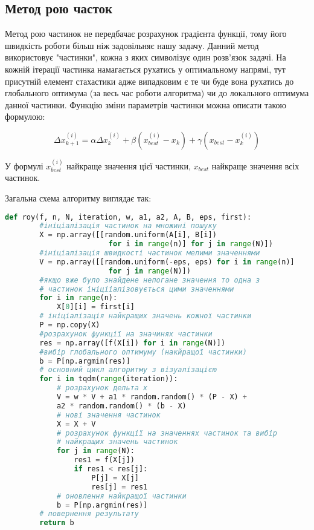 \subsection{Метод рою часток}


Метод рою частинок не передбачає розрахунок градієнта функції, тому його 
швидкість роботи більш ніж задовільняє нашу задачу.
Данний метод використовує "частинки", кожна з яких символізує один
розв'язок задачі. На кожній ітерації частинка намагається рухатись у 
оптимальному напрямі, тут присутній елемент стахастики адже випадковим є те 
чи буде вона рухатись до глобального оптимума (за весь час 
роботи алгоритма) чи до локального оптимума данної частинки. 
Функцію зміни параметрів частинки можна описати такою формулою: 

$$\Delta x_{k + 1}^{(i)} = \alpha \Delta x_k^{(i)} + 
\beta (x_{best}^{(i)} - x_k) + \gamma(x_{best} - x_k^{(i)})$$


У формулі $x_{best}^{(i)}$ найкраще значення цієї частинки, 
$x_{best}$ найкраще значення всіх частинок. 


Загальна схема алгоритму виглядає так: 
\begin{lstlisting}[language=Python, caption=Python example]
    def roy(f, n, N, iteration, w, a1, a2, A, B, eps, first):
        #ініціалізація частинок на множині пошуку
        X = np.array([[random.uniform(A[i], B[i]) 
                        for i in range(n)] for j in range(N)])
        #ініціалізація швидкості частинок мелими значеннями
        V = np.array([[random.uniform(-eps, eps) for i in range(n)] 
                        for j in range(N)])
        #якщо вже було знайдене непогане значення то одна з 
        # частинок ініцііалізовується цими значеннями
        for i in range(n):
            X[0][i] = first[i]
        # ініціалізація найкращих значень кожної частинки
        P = np.copy(X)
        #розрахунок функції на значинях частинки
        res = np.array([f(X[i]) for i in range(N)])
        #вибір глобального оптимуму (накйращої частинки)
        b = P[np.argmin(res)]
        # основний цикл алгоритму з візуалізацією
        for i in tqdm(range(iteration)):
            # розрахунок дельта х
            V = w * V + a1 * random.random() * (P - X) + 
            a2 * random.random() * (b - X)
            # нові значення частинок 
            X = X + V
            # розрахунок функції на значеннях частинок та вибір
            # найкращих значень частинок
            for j in range(N):
                res1 = f(X[j])
                if res1 < res[j]:
                    P[j] = X[j]
                    res[j] = res1
            # оновлення найкращої частинки
            b = P[np.argmin(res)]
        # повернення результату
        return b
\end{lstlisting}


